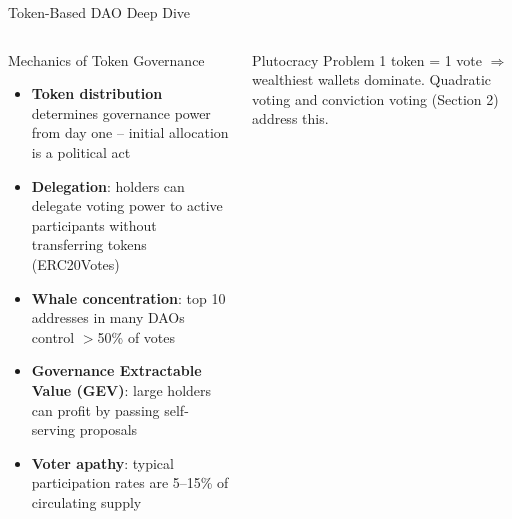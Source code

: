 \documentclass[8pt,aspectratio=169]{beamer}
\begin{document}
\begin{frame}{Token-Based DAO Deep Dive}
\begin{columns}[T]
\begin{block}{Mechanics of Token Governance}
\footnotesize
\begin{itemize}
  \item \textbf{Token distribution} determines governance power from day one -- initial allocation is a political act
  \item \textbf{Delegation}: holders can delegate voting power to active participants without transferring tokens (ERC20Votes)
  \item \textbf{Whale concentration}: top 10 addresses in many DAOs control $>$50\% of votes
  \item \textbf{Governance Extractable Value (GEV)}: large holders can profit by passing self-serving proposals
  \item \textbf{Voter apathy}: typical participation rates are 5--15\% of circulating supply
\end{itemize}
\end{block}
\vspace{2mm}
\begin{alertblock}{Plutocracy Problem}
\footnotesize
1 token = 1 vote \(\Rightarrow\) wealthiest wallets dominate. Quadratic voting and conviction voting (Section 2) address this.
\end{alertblock}


\end{columns}
\end{frame}
\end{document}
